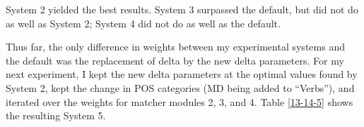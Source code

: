 \documentclass[paper=a4, fontsize=11pt]{scrartcl}
\numberwithin{equation}{section}		%
\numberwithin{figure}{section}			%
\numberwithin{table}{section}				%
\begin{document}
System 2 yielded the best results.  System 3 surpassed the default, but did not do as well as System 2; System 4 did not do as well as the default.

Thus far, the only difference in weights between my experimental systems and the default was the replacement of delta by the new delta parameters.  For my next experiment, I kept the new delta parameters at the optimal values found by System 2, kept the change in POS categories (MD being added to ``Verbs''), and iterated over the weights for matcher modules 2, 3, and 4.  Table \ref{13-14-5} shows the resulting System 5.

\begin{table}[htbp]
\caption{Training Set Results\textemdash System 5}
\label{13-14-5}
\end{table}
\end{document}
